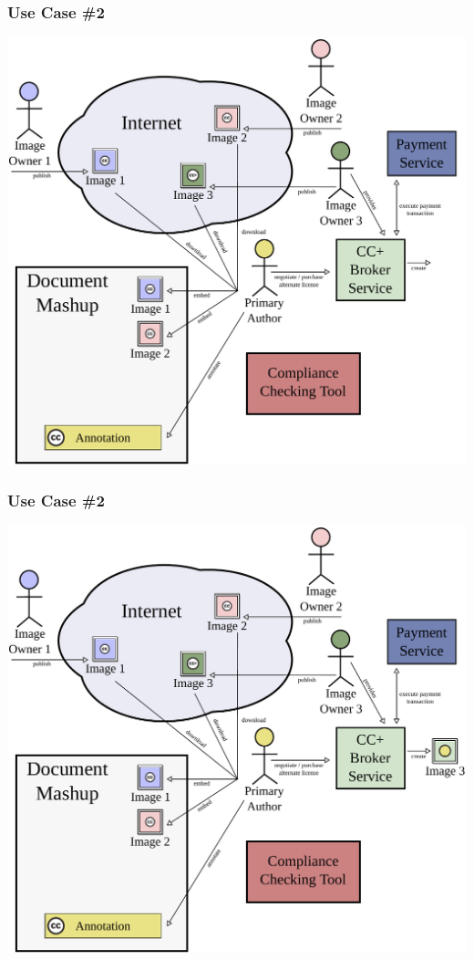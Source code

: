 \documentclass[mathserif,xcolor=dvipsnames,hyperref={bookmarks=true}]{beamer}
\begin{document}
    \begin{frame}[t]
        \frametitle{Use Case \#2}
        \begin{center}
            \includegraphics[width=0.9\textheight]{../resources/usecases/usecase2/usecase2-step34.pdf}
        \end{center}
    \end{frame}
    \begin{frame}[t]
        \frametitle{Use Case \#2}
        \begin{center}
            \includegraphics[width=0.9\textheight]{../resources/usecases/usecase2/usecase2-step35.pdf}
        \end{center}
    \end{frame}
\end{document}
